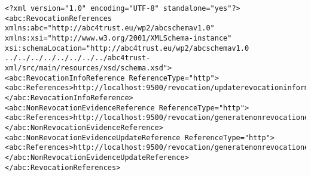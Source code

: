 \begin{lstlisting}[caption=IDEMIX Revocation References]
<?xml version="1.0" encoding="UTF-8" standalone="yes"?>
<abc:RevocationReferences 
xmlns:abc="http://abc4trust.eu/wp2/abcschemav1.0"
xmlns:xsi="http://www.w3.org/2001/XMLSchema-instance" 
xsi:schemaLocation="http://abc4trust.eu/wp2/abcschemav1.0 ../../../../../../../../abc4trust-xml/src/main/resources/xsd/schema.xsd">
<abc:RevocationInfoReference ReferenceType="http">
<abc:References>http://localhost:9500/revocation/updaterevocationinformation</abc:References>
</abc:RevocationInfoReference>
<abc:NonRevocationEvidenceReference ReferenceType="http">
<abc:References>http://localhost:9500/revocation/generatenonrevocationevidence</abc:References>
</abc:NonRevocationEvidenceReference>
<abc:NonRevocationEvidenceUpdateReference ReferenceType="http">
<abc:References>http://localhost:9500/revocation/generatenonrevocationevidenceupdate</abc:References>
</abc:NonRevocationEvidenceUpdateReference>
</abc:RevocationReferences>
\end{lstlisting}